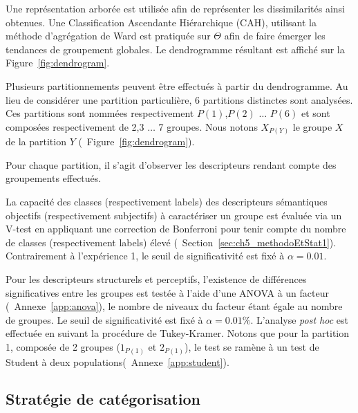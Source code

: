 Une représentation arborée est utilisée afin de représenter les dissimilarités ainsi obtenues. Une Classification Ascendante Hiérarchique (CAH), utilisant la méthode d’agrégation de Ward est pratiquée sur $\Theta$  afin de faire émerger les tendances de groupement globales. Le dendrogramme résultant est affiché sur la Figure~\ref{fig:dendrogram}. 

Plusieurs partitionnements peuvent être effectués à partir du dendrogramme. Au lieu de considérer une partition particulière, 6  partitions distinctes sont analysées. Ces partitions sont nommées respectivement $P(1)$,$P(2)$ $\ldots$ $P(6)$ et sont composées respectivement de 2,3 $\ldots$ 7 groupes. Nous notons $X_{P(Y)}$ le groupe $X$ de la partition $Y$ (\cf~Figure~\ref{fig:dendrogram}).

Pour chaque partition, il s'agit d'observer les descripteurs rendant compte des groupements effectués. 

La capacité des classes (respectivement labels) des descripteurs sémantiques objectifs (respectivement subjectifs) à caractériser un groupe est évaluée via un V-test en appliquant une correction de Bonferroni pour tenir compte du nombre de classes (respectivement labels) élevé (\cf~Section~\ref{sec:ch5_methodoEtStat1}). Contrairement à l'expérience 1, le seuil de significativité est fixé à $\alpha=0.01$.

Pour les descripteurs structurels et perceptifs, l'existence de différences significatives entre les groupes est testée à l'aide d'une ANOVA à un facteur (\cf~Annexe~\ref{app:anova}), le nombre de niveaux du facteur étant égale au nombre de groupes. Le seuil de significativité est fixé à $\alpha=0.01\%$. L'analyse \emph{post hoc} est effectuée en suivant la procédure de Tukey-Kramer. Notons que pour la partition 1, composée de 2 groupes ($1_{P(1)}$ et $2_{P(1)}$), le test se ramène à un test de Student à deux populations(\cf~Annexe~\ref{app:student}).

\subsection{Stratégie de catégorisation}

